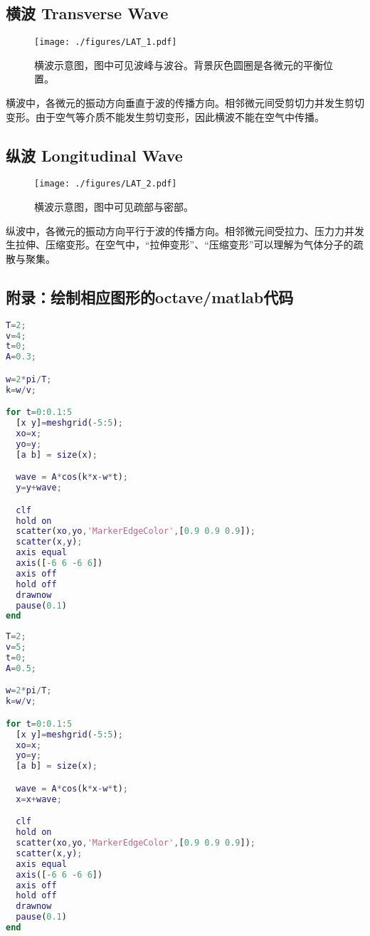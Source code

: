 
\subsection{横波 Transverse Wave}
\begin{figure}[ht]
\centering
\texttt{[image: ./figures/LAT\_1.pdf]}
\caption{横波示意图，图中可见波峰与波谷。背景灰色圆圈是各微元的平衡位置。} \label{LAT_fig1}
\end{figure}
横波中，各微元的振动方向垂直于波的传播方向。相邻微元间受剪切力并发生剪切变形。由于空气等介质不能发生剪切变形，因此横波不能在空气中传播。

\subsection{纵波 Longitudinal Wave}
\begin{figure}[ht]
\centering
\texttt{[image: ./figures/LAT\_2.pdf]}
\caption{横波示意图，图中可见疏部与密部。} \label{LAT_fig2}
\end{figure}
纵波中，各微元的振动方向平行于波的传播方向。相邻微元间受拉力、压力力并发生拉伸、压缩变形。在空气中，“拉伸变形”、“压缩变形”可以理解为气体分子的疏散与聚集。

\subsection{附录：绘制相应图形的octave/matlab代码}
\begin{lstlisting}[language=matlab]
%绘制横波
T=2;
v=4;
t=0;
A=0.3;

w=2*pi/T;
k=w/v;

for t=0:0.1:5
  [x y]=meshgrid(-5:5);
  xo=x;
  yo=y;
  [a b] = size(x);

  wave = A*cos(k*x-w*t);
  y=y+wave;

  clf
  hold on
  scatter(xo,yo,'MarkerEdgeColor',[0.9 0.9 0.9]);
  scatter(x,y);
  axis equal
  axis([-6 6 -6 6])
  axis off
  hold off
  drawnow
  pause(0.1)
end

\end{lstlisting}

\begin{lstlisting}[language=matlab]
%绘制纵波
T=2;
v=5;
t=0;
A=0.5;

w=2*pi/T;
k=w/v;

for t=0:0.1:5
  [x y]=meshgrid(-5:5);
  xo=x;
  yo=y;
  [a b] = size(x);

  wave = A*cos(k*x-w*t);
  x=x+wave;

  clf
  hold on
  scatter(xo,yo,'MarkerEdgeColor',[0.9 0.9 0.9]);
  scatter(x,y);
  axis equal
  axis([-6 6 -6 6])
  axis off
  hold off
  drawnow
  pause(0.1)
end
\end{lstlisting}
